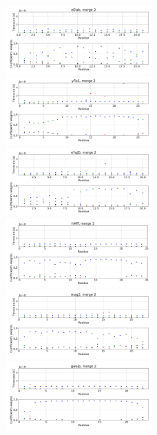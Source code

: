 \documentclass[12pt]{article}
\begin{document}
\begin{figure}
\centering
\includegraphics[width=0.5\textwidth]{eElab_2_slow_lin.png}
\includegraphics[width=0.5\textwidth]{yFis1_2_slow_lin.png}
\includegraphics[width=0.5\textwidth]{eYqjD_2_slow_lin.png}
\includegraphics[width=0.5\textwidth]{hMff_2_slow_lin.png}
\includegraphics[width=0.5\textwidth]{mag2_2_slow_lin.png}
\includegraphics[width=0.5\textwidth]{gwalp_2_slow_lin.png}
\end{figure}
\end{document}
